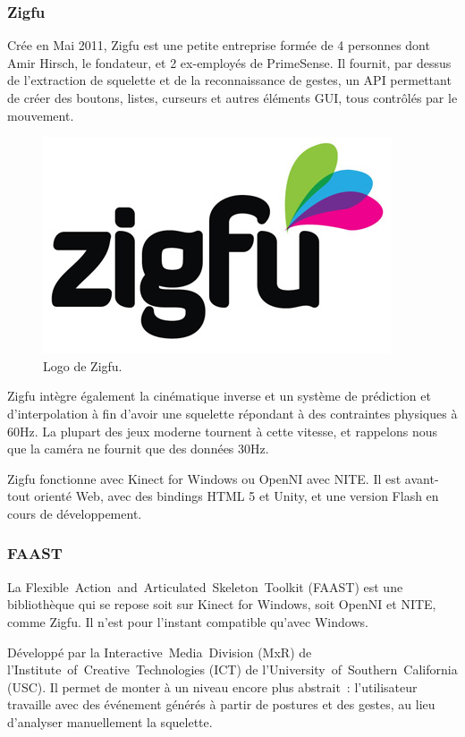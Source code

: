 \subsubsection{Zigfu}
Crée en Mai 2011, Zigfu est une petite entreprise formée de 4 personnes dont 
Amir Hirsch, le fondateur, et 2 ex-employés de PrimeSense. Il fournit, 
par dessus de l'extraction de squelette et de la reconnaissance
de gestes, un API permettant de créer des boutons, listes, curseurs et autres
éléments GUI, tous contrôlés par le mouvement.
\begin{figure}[h!]
\centering
\includegraphics[width=0.3\linewidth]{images/zigfu_logo}
\caption{Logo de Zigfu.}
\end{figure}
Zigfu intègre également la cinématique inverse et un système de 
prédiction et
d'interpolation à fin d'avoir une squelette répondant à des contraintes 
physiques à 60Hz. La plupart des jeux moderne tournent à cette vitesse, et 
rappelons nous que la caméra ne fournit que des données 30Hz.

Zigfu fonctionne avec Kinect for Windows ou OpenNI avec NITE. Il est 
avant-tout orienté Web, avec des
bindings HTML 5 et Unity, et une version Flash en cours de développement.


\subsubsection{FAAST}
La Flexible~Action~and~Articulated~Skeleton~Toolkit (FAAST) est une 
bibliothèque qui se repose soit sur Kinect for Windows, soit OpenNI et NITE, 
comme Zigfu. Il n'est pour l'instant compatible qu'avec Windows.

Développé par la Interactive~Media~Division (MxR) de 
l'Institute~of~Creative~Technologies (ICT) de 
l'University~of~Southern~California (USC). Il permet de monter à un niveau 
encore plus abstrait~: l'utilisateur travaille avec des événement générés à
partir de postures et des gestes, au lieu d'analyser manuellement la 
squelette.

